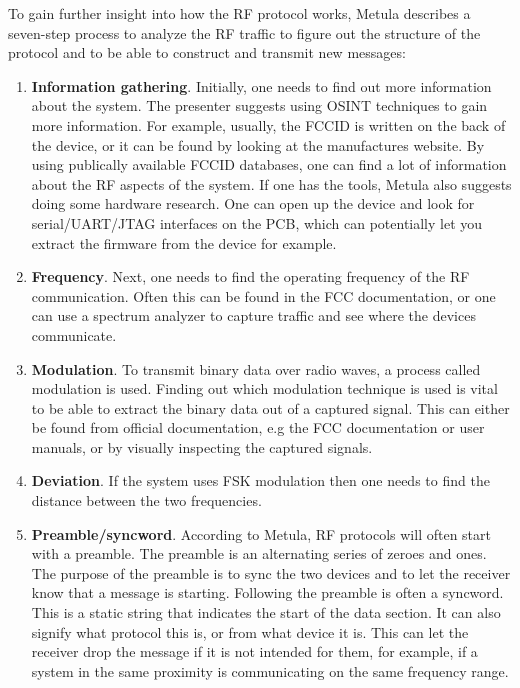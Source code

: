 To gain further insight into how the RF protocol works, Metula describes a seven-step process to analyze the RF traffic to figure out the structure of the protocol and to be able to construct and transmit new messages:
\begin{enumerate}
    \item \textbf{Information gathering}. Initially, one needs to find out more information about the system. The presenter suggests using \gls{OSINT} techniques to gain more information. For example, usually, the FCCID is written on the back of the device, or it can be found by looking at the manufactures website. By using publically available FCCID databases, one can find a lot of information about the RF aspects of the system. If one has the tools, Metula also suggests doing some hardware research. One can open up the device and look for serial/UART/JTAG interfaces on the PCB, which can potentially let you extract the firmware from the device for example.
    
    \item \textbf{Frequency}. Next, one needs to find the operating frequency of the RF communication. Often this can be found in the FCC documentation, or one can use a spectrum analyzer to capture traffic and see where the devices communicate.
    
    \item \textbf{Modulation}. To transmit binary data over radio waves, a process called modulation is used. Finding out which modulation technique is used is vital to be able to extract the binary data out of a captured signal. This can either be found from official documentation, e.g the FCC documentation or user manuals, or by visually inspecting the captured signals.
    
    \item \textbf{Deviation}. If the system uses \gls{FSK} modulation then one needs to find the distance between the two frequencies.
    
    \item \textbf{Preamble/syncword}. According to Metula, RF protocols will often start with a preamble. The preamble is an alternating series of zeroes and ones. The purpose of the preamble is to sync the two devices and to let the receiver know that a message is starting. Following the preamble is often a syncword. This is a static string that indicates the start of the data section. It can also signify what protocol this is, or from what device it is. This can let the receiver drop the message if it is not intended for them, for example, if a system in the same proximity is communicating on the same frequency range.
    

\end{enumerate}
